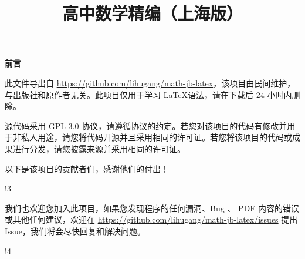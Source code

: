 \documentclass{article}
\title{高中数学精编（上海版）}
\begin{document}
\maketitle

\newpage

\pagestyle{fancy}
\renewcommand{\footrulewidth}{0pt}
\renewcommand{\headrulewidth}{0pt}
\fancyfoot[C]{\thepage}

\begin{center}
    \Large \textbf{前言}
\end{center}

此文件导出自 \url{https://github.com/lihugang/math-jb-latex}，该项目由民间维护，与出版社和原作者无关。此项目仅用于学习 \LaTeX 语法，请在下载后 $24$ 小时内删除。

源代码采用 \href{https://github.com/lihugang/math-jb-latex/blob/master/LICENSE}{GPL-3.0} 协议，请遵循协议的约定。若您对该项目的代码有修改并用于非私人用途，请您将代码开源并且采用相同的许可证。若您将该项目的代码或成果进行分发，请您披露来源并采用相同的许可证。

\vspace{0.5cm}

以下是该项目的贡献者们，感谢他们的付出！

!3

\vspace{0.5cm}

我们也欢迎您加入此项目，如果您发现程序的任何漏洞、Bug 、 PDF 内容的错误或其他任何建议，欢迎在 \url{https://github.com/lihugang/math-jb-latex/issues} 提出 Issue，我们将会尽快回复和解决问题。

\newpage

\tableofcontents

!4
\end{document}
